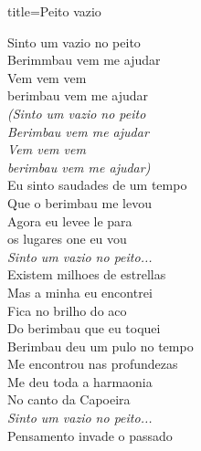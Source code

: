 \documentclass[fontsize=14pt, twoside]{scrreprt}
\begin{document}
\begin{multicols*}{2}
\begin{song}{title={Peito vazio}}
        \begin{verse*}
            Sinto um vazio no peito\\
            Berimmbau vem me ajudar\\
            Vem vem vem\\
            berimbau vem me ajudar\\
            \textit{(Sinto um vazio no peito}\\
            \textit{Berimbau vem me ajudar}\\
            \textit{Vem vem vem}\\
            \textit{berimbau vem me ajudar)}\\
            Eu sinto saudades de um tempo\\
            Que o berimbau me levou\\
            Agora eu levee le para\\
            os lugares one eu vou\\
            \textit{Sinto um vazio no peito...}\\
            Existem milhoes de estrellas\\
            Mas a minha eu encontrei\\
            Fica no brilho do aco\\
            Do berimbau que eu toquei\\
            Berimbau deu um pulo no tempo\\
            Me encontrou nas profundezas\\
            Me deu toda a harmaonia\\
            No canto da Capoeira\\
            \textit{Sinto um vazio no peito...}\\
            Pensamento invade o passado\\
        \end{verse*}
\end{song}

\columnbreak


\end{multicols*}
\end{document}
